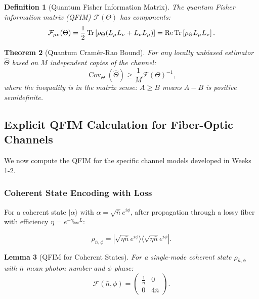 \documentclass[12pt]{article}
\newtheorem{theorem}{Theorem}[section]
\newtheorem{lemma}[theorem]{Lemma}
\newtheorem{definition}[theorem]{Definition}
\newcommand{\Cov}{\operatorname{Cov}}
\begin{document}
\begin{definition}[Quantum Fisher Information Matrix]
The quantum Fisher information matrix (QFIM) \(\mathcal{F}(\Theta)\) has components:
\begin{equation}
    \mathcal{F}_{\mu\nu}(\Theta) = \frac{1}{2}\Tr\left[\rho_\Theta (L_\mu L_\nu + L_\nu L_\mu)\right] = \Re\Tr\left[\rho_\Theta L_\mu L_\nu\right].
\end{equation}
\end{definition}

\begin{theorem}[Quantum Cram\'er-Rao Bound]
For any locally unbiased estimator \(\hat{\Theta}\) based on \(M\) independent copies of the channel:
\begin{equation}
    \Cov_\Theta(\hat{\Theta}) \geq \frac{1}{M} \mathcal{F}(\Theta)^{-1},
\end{equation}
where the inequality is in the matrix sense: \(A \geq B\) means \(A - B\) is positive semidefinite.
\end{theorem}

\subsection{Explicit QFIM Calculation for Fiber-Optic Channels}

We now compute the QFIM for the specific channel models developed in Weeks 1-2.

\subsubsection{Coherent State Encoding with Loss}

For a coherent state \(|\alpha\rangle\) with \(\alpha = \sqrt{\bar{n}}e^{i\phi}\), after propagation through a lossy fiber with efficiency \(\eta = e^{-\gamma_{\text{loss}}L}\):

\begin{equation}
    \rho_{\bar{n},\phi} = |\sqrt{\eta\bar{n}} e^{i\phi}\rangle\langle\sqrt{\eta\bar{n}} e^{i\phi}|.
\end{equation}

\begin{lemma}[QFIM for Coherent States]
For a single-mode coherent state \(\rho_{\bar{n},\phi}\) with \(\bar{n}\) mean photon number and \(\phi\) phase:
\begin{equation}
    \mathcal{F}(\bar{n},\phi) = \begin{pmatrix} \frac{1}{\bar{n}} & 0 \\ 0 & 4\bar{n} \end{pmatrix}.
\end{equation}
\end{lemma}
\end{document}
